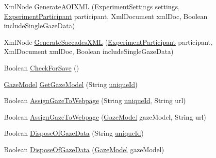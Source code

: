 \begin{DoxyCompactItemize}
\item 
Xml\+Node \hyperlink{class_web_analyzer_1_1_models_1_1_data_model_1_1_test_model_a5fbd82aef3cf27ecf196f7daff4422da}{Generate\+A\+O\+I\+X\+M\+L} (\hyperlink{class_web_analyzer_1_1_models_1_1_settings_model_1_1_experiment_settings}{Experiment\+Settings} settings, \hyperlink{class_web_analyzer_1_1_models_1_1_base_1_1_experiment_participant}{Experiment\+Participant} participant, Xml\+Document xml\+Doc, Boolean include\+Single\+Gaze\+Data)
\item 
Xml\+Node \hyperlink{class_web_analyzer_1_1_models_1_1_data_model_1_1_test_model_a07fd0a4cf43fd9c9dfca89d0583e4609}{Generate\+Saccades\+X\+M\+L} (\hyperlink{class_web_analyzer_1_1_models_1_1_base_1_1_experiment_participant}{Experiment\+Participant} participant, Xml\+Document xml\+Doc, Boolean include\+Single\+Gaze\+Data)
\item 
Boolean \hyperlink{class_web_analyzer_1_1_models_1_1_data_model_1_1_test_model_abc6d6772659bfd91a6d1fe6923ca7a2b}{Check\+For\+Save} ()
\item 
\hyperlink{class_web_analyzer_1_1_models_1_1_data_model_1_1_gaze_model}{Gaze\+Model} \hyperlink{class_web_analyzer_1_1_models_1_1_data_model_1_1_test_model_a276585c6c2bdca3cf99058e2287636dc}{Get\+Gaze\+Model} (String \hyperlink{_u_i_2_h_t_m_l_resources_2js_2lib_2underscore_8min_8js_af690ff5521d79c7128861033ae80ae17}{unique\+Id})
\item 
Boolean \hyperlink{class_web_analyzer_1_1_models_1_1_data_model_1_1_test_model_a5c8db4f36460523cfefc5726bfd31177}{Assign\+Gaze\+To\+Webpage} (String \hyperlink{_u_i_2_h_t_m_l_resources_2js_2lib_2underscore_8min_8js_af690ff5521d79c7128861033ae80ae17}{unique\+Id}, String url)
\item 
Boolean \hyperlink{class_web_analyzer_1_1_models_1_1_data_model_1_1_test_model_aa2f20e0defbef5daf8b4cbe282fc6a25}{Assign\+Gaze\+To\+Webpage} (\hyperlink{class_web_analyzer_1_1_models_1_1_data_model_1_1_gaze_model}{Gaze\+Model} gaze\+Model, String url)
\item 
Boolean \hyperlink{class_web_analyzer_1_1_models_1_1_data_model_1_1_test_model_a4e84c40eeb26adae1fcacc4ffc291d2f}{Dispose\+Of\+Gaze\+Data} (String \hyperlink{_u_i_2_h_t_m_l_resources_2js_2lib_2underscore_8min_8js_af690ff5521d79c7128861033ae80ae17}{unique\+Id})
\item 
Boolean \hyperlink{class_web_analyzer_1_1_models_1_1_data_model_1_1_test_model_a5f84a8ffb744cbe5dc345e1f34bff9a6}{Dispose\+Of\+Gaze\+Data} (\hyperlink{class_web_analyzer_1_1_models_1_1_data_model_1_1_gaze_model}{Gaze\+Model} gaze\+Model)

\end{DoxyCompactItemize}
